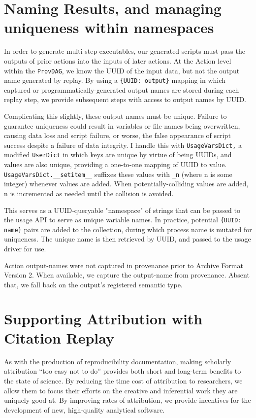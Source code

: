 \section{Naming Results, and managing uniqueness within namespaces}

In order to generate multi-step executables, our generated scripts must pass the
outputs of prior actions into the inputs of later actions. At the Action level
within the \texttt{ProvDAG}, we know the UUID of the input data, but not the output name
generated by replay. By using a \texttt{\{UUID: output\}} mapping in which captured or
programmatically-generated output names are stored during each replay step, we
provide subsequent steps with access to output names by UUID.

Complicating this slightly, these output names must be unique. Failure to
guarantee uniqueness could result in variables or file names being overwritten,
causing data loss and script failure, or worse, the false appearance of script
success despite a failure of data integrity. I handle this with \texttt{UsageVarsDict,} a
modified \texttt{UserDict} in which keys are unique by virtue of being UUIDs, and values
are also unique, providing a one-to-one mapping of UUID to value.
\texttt{UsageVarsDict.\_\_setitem\_\_} suffixes these values with \texttt{\_n} (where n is some
integer) whenever values are added. When potentially-colliding values are added,
n is incremented as needed until the collision is avoided. 

This serves as a UUID-queryable "namespace" of strings that can be passed to the
usage API to serve as unique variable names. In practice, potential \texttt{\{UUID: name\}}
pairs are added to the collection, during which process name is mutated for
uniqueness. The unique name is then retrieved by UUID, and passed to the usage
driver for use.

Action output-names were not captured in provenance prior to Archive Format
Version 2. When available, we capture the output-name from provenance. Absent
that, we fall back on the output’s registered semantic type.


\section{Supporting Attribution with Citation Replay}

As with the production of reproducibility documentation, making scholarly
attribution “too easy not to do” provides both short and long-term benefits to
the state of science. By reducing the time cost of attribution to researchers,
we allow them to focus their efforts on the creative and inferential work they
are uniquely good at. By improving rates of attribution, we provide incentives
for the development of new, high-quality analytical software. 

